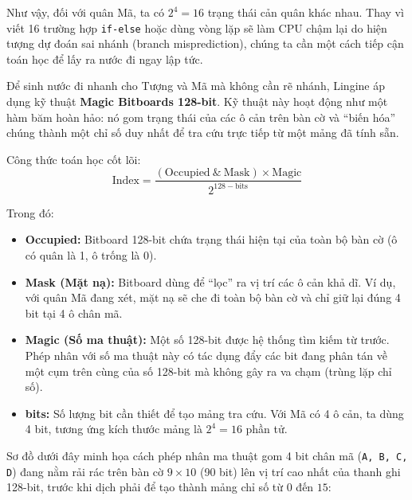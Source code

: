 Như vậy, đối với quân Mã, ta có $2^4 = 16$ trạng thái cản quân khác nhau. Thay vì viết 16 trường hợp \texttt{if-else} hoặc dùng vòng lặp sẽ làm CPU chậm lại do hiện tượng dự đoán sai nhánh (branch misprediction), chúng ta cần một cách tiếp cận toán học để lấy ra nước đi ngay lập tức.

Để sinh nước đi nhanh cho Tượng và Mã mà không cần rẽ nhánh, Lingine áp dụng kỹ thuật \textbf{Magic Bitboards 128-bit}. Kỹ thuật này hoạt động như một hàm băm hoàn hảo: nó gom trạng thái của các ô cản trên bàn cờ và ``biến hóa'' chúng thành một chỉ số duy nhất để tra cứu trực tiếp từ một mảng đã tính sẵn.

Công thức toán học cốt lõi:
\[ \text{Index} = \frac{(\text{Occupied} \ \& \ \text{Mask}) \times \text{Magic}}{2^{128 - \text{bits}}} \]

Trong đó:
\begin{itemize}
    \item \textbf{Occupied:} Bitboard 128-bit chứa trạng thái hiện tại của toàn bộ bàn cờ (ô có quân là 1, ô trống là 0).
    \item \textbf{Mask (Mặt nạ):} Bitboard dùng để ``lọc'' ra vị trí các ô cản khả dĩ. Ví dụ, với quân Mã đang xét, mặt nạ sẽ che đi toàn bộ bàn cờ và chỉ giữ lại đúng 4 bit tại 4 ô chân mã.
    \item \textbf{Magic (Số ma thuật):} Một số 128-bit được hệ thống tìm kiếm từ trước. Phép nhân với số ma thuật này có tác dụng đẩy các bit đang phân tán về một cụm trên cùng của số 128-bit mà không gây ra va chạm (trùng lặp chỉ số).
    \item \textbf{bits:} Số lượng bit cần thiết để tạo mảng tra cứu. Với Mã có 4 ô cản, ta dùng 4 bit, tương ứng kích thước mảng là $2^4 = 16$ phần tử.
\end{itemize}

Sơ đồ dưới đây minh họa cách phép nhân ma thuật gom 4 bit chân mã (\texttt{A, B, C, D}) đang nằm rải rác trên bàn cờ $9 \times 10$ (90 bit) lên vị trí cao nhất của thanh ghi 128-bit, trước khi dịch phải để tạo thành mảng chỉ số từ $0$ đến $15$:

